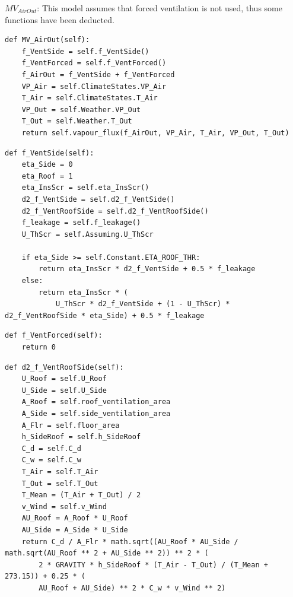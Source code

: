 \documentclass[a4paper]{article}
\numberwithin{equation}{section}
\begin{document}
\( MV_{AirOut} \):
This model assumes that forced ventilation is not used, thus some functions have been deducted.
\begin{mdframed}[leftline=false,rightline=false,backgroundcolor=magenta!10,nobreak=true]
  \begin{verbatim}
def MV_AirOut(self):
    f_VentSide = self.f_VentSide()
    f_VentForced = self.f_VentForced()
    f_AirOut = f_VentSide + f_VentForced
    VP_Air = self.ClimateStates.VP_Air
    T_Air = self.ClimateStates.T_Air
    VP_Out = self.Weather.VP_Out
    T_Out = self.Weather.T_Out
    return self.vapour_flux(f_AirOut, VP_Air, T_Air, VP_Out, T_Out)
  \end{verbatim}
\end{mdframed}
\begin{mdframed}[leftline=false,rightline=false,backgroundcolor=magenta!10,nobreak=true]
  \begin{verbatim}
def f_VentSide(self):
    eta_Side = 0
    eta_Roof = 1
    eta_InsScr = self.eta_InsScr()
    d2_f_VentSide = self.d2_f_VentSide()
    d2_f_VentRoofSide = self.d2_f_VentRoofSide()
    f_leakage = self.f_leakage()
    U_ThScr = self.Assuming.U_ThScr

    if eta_Side >= self.Constant.ETA_ROOF_THR:
        return eta_InsScr * d2_f_VentSide + 0.5 * f_leakage
    else:
        return eta_InsScr * (
            U_ThScr * d2_f_VentSide + (1 - U_ThScr) * d2_f_VentRoofSide * eta_Side) + 0.5 * f_leakage
  \end{verbatim}
\end{mdframed}
\begin{mdframed}[leftline=false,rightline=false,backgroundcolor=magenta!10,nobreak=true]
  \begin{verbatim}
def f_VentForced(self):
    return 0
  \end{verbatim}
\end{mdframed}
\begin{mdframed}[leftline=false,rightline=false,backgroundcolor=magenta!10,nobreak=true]
  \begin{verbatim}
def d2_f_VentRoofSide(self):
    U_Roof = self.U_Roof
    U_Side = self.U_Side
    A_Roof = self.roof_ventilation_area
    A_Side = self.side_ventilation_area
    A_Flr = self.floor_area
    h_SideRoof = self.h_SideRoof
    C_d = self.C_d
    C_w = self.C_w
    T_Air = self.T_Air
    T_Out = self.T_Out
    T_Mean = (T_Air + T_Out) / 2
    v_Wind = self.v_Wind
    AU_Roof = A_Roof * U_Roof
    AU_Side = A_Side * U_Side
    return C_d / A_Flr * math.sqrt((AU_Roof * AU_Side / math.sqrt(AU_Roof ** 2 + AU_Side ** 2)) ** 2 * (
        2 * GRAVITY * h_SideRoof * (T_Air - T_Out) / (T_Mean + 273.15)) + 0.25 * (
        AU_Roof + AU_Side) ** 2 * C_w * v_Wind ** 2)
  \end{verbatim}
\end{mdframed}
\end{document}
